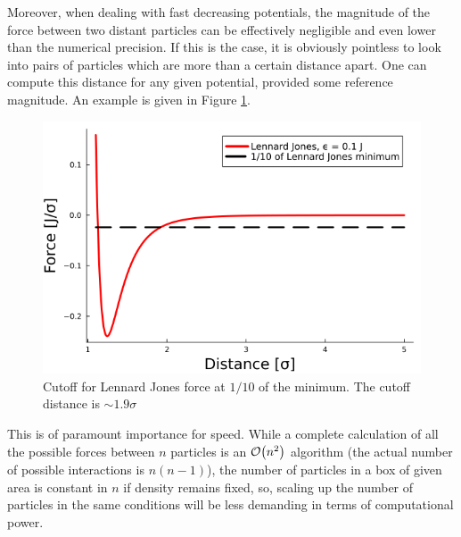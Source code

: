 \documentclass[../../master_thesis_np.tex]{subfiles}
\begin{document}
	{\color{brown}Moreover, when dealing with fast decreasing potentials, the magnitude of the force between two distant particles can be effectively negligible and even lower than the numerical precision.}
	If this is the case, it is obviously pointless to look into pairs of particles which are more than a certain distance apart. 
	One can compute this distance for any given potential, provided some reference magnitude. 
	An example is given in Figure \ref{fig:force_zero}.
	\begin{figure}[htp]
		\centering
		\includegraphics[width=\textwidth]{lj_zero.png}
		\caption{Cutoff for Lennard Jones force at $1/10$ of the minimum. The cutoff distance is $\sim 1.9\sigma$}
		\label{fig:force_zero}
	\end{figure}
	This is of paramount importance for speed. 
	While a complete calculation of all the possible forces between $n$ particles is an $\order{n^2}$ algorithm (the actual number of possible interactions is $n(n-1)$), the number of particles in a box of given area is constant in $n$ if density remains fixed, so, scaling up the number of particles in the same conditions will be less demanding in terms of computational power.
	
\end{document}
